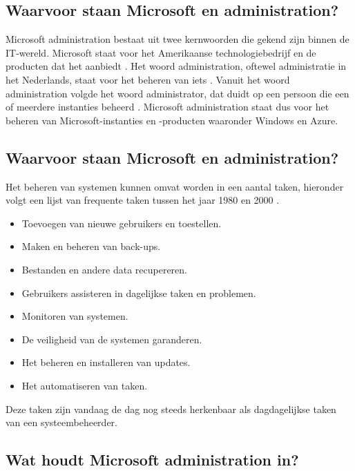 \subsection{Waarvoor staan Microsoft en administration?}

Microsoft administration bestaat uit twee kernwoorden die gekend zijn binnen de IT-wereld. Microsoft staat voor het Amerikaanse technologiebedrijf en de producten dat het aanbiedt \autocite{Warner2019}. Het woord administration, oftewel administratie in het Nederlands, staat voor het beheren van iets \autocite{VDU2023}. Vanuit het woord administration volgde het woord administrator, dat duidt op een persoon die een of meerdere instanties beheerd \autocite{VDU2023a}. Microsoft administration staat dus voor het beheren van Microsoft-instanties en -producten waaronder Windows en Azure. 

\subsection{Waarvoor staan Microsoft en administration?}

Het beheren van systemen kunnen omvat worden in een aantal taken, hieronder volgt een lijst van frequente taken tussen het jaar 1980 en 2000 \autocite{Frisch2002}.

\begin{itemize}
    \item Toevoegen van nieuwe gebruikers en toestellen.
    \item Maken en beheren van back-ups.
    \item Bestanden en andere data recupereren.
    \item Gebruikers assisteren in dagelijkse taken en problemen.
    \item Monitoren van systemen.
    \item De veiligheid van de systemen garanderen.
    \item Het beheren en installeren van updates.
    \item Het automatiseren van taken.
\end{itemize}

Deze taken zijn vandaag de dag nog steeds herkenbaar als dagdagelijkse taken van een systeembeheerder. 

\subsection{Wat houdt Microsoft administration in?}

